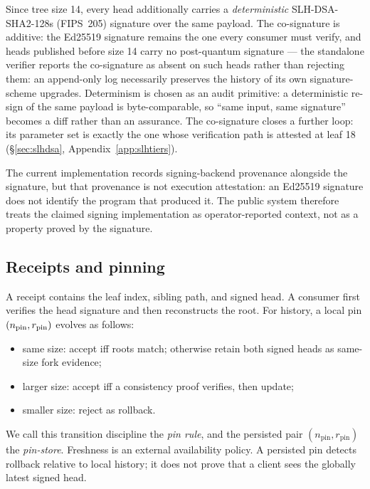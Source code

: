 \documentclass[11pt]{article}
\theoremstyle{remark}
\begin{document}
Since tree size 14, every head additionally carries a \emph{deterministic}
SLH-DSA-SHA2-128s (FIPS~205) signature over the same payload. The
co-signature is additive: the Ed25519 signature remains the one every
consumer must verify, and heads published before size 14 carry no
post-quantum signature --- the standalone verifier reports the co-signature as
absent on such heads rather than rejecting them: an append-only log
necessarily preserves the history of its own signature-scheme upgrades. Determinism is chosen as an audit primitive: a
deterministic re-sign of the same payload is byte-comparable, so ``same
input, same signature'' becomes a diff rather than an assurance. The
co-signature closes a further loop: its parameter set is exactly the one
whose verification path is attested at leaf 18
(\S\ref{sec:slhdsa}, Appendix~\ref{app:slhtiers}).

The current implementation records signing-backend provenance alongside the
signature, but that provenance is not execution attestation: an Ed25519
signature does not identify the program that produced it. The public system
therefore treats the claimed signing implementation as operator-reported
context, not as a property proved by the signature.

\subsection{Receipts and pinning}

A receipt contains the leaf index, sibling path, and signed head. A consumer
first verifies the head signature and then reconstructs the root. For history,
a local pin $(n_{\rm pin},r_{\rm pin})$ evolves as follows:
\begin{itemize}[leftmargin=1.6em,itemsep=2pt]
\item same size: accept iff roots match; otherwise retain both signed heads as
same-size fork evidence;
\item larger size: accept iff a consistency proof verifies, then update;
\item smaller size: reject as rollback.
\end{itemize}

We call this transition discipline the \emph{pin rule}, and the persisted
pair $(n_{\mathrm{pin}},r_{\mathrm{pin}})$ the \emph{pin-store}.
Freshness is an external availability policy. A persisted pin detects rollback
relative to local history; it does not prove that a client sees the globally
latest signed head.
\end{document}
